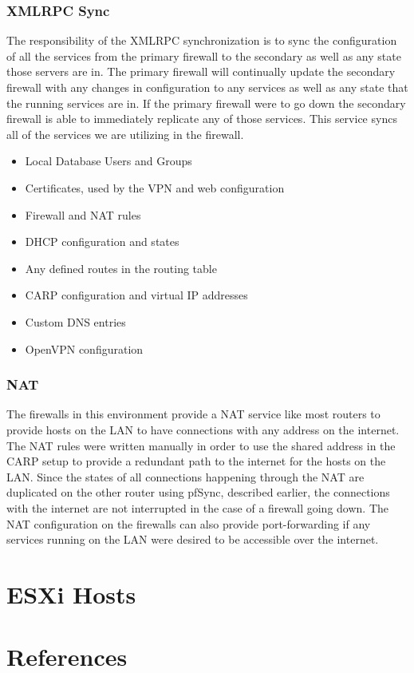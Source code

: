 \documentclass[12pt]{IEEEtran}
\begin{document}
\subsubsection{XMLRPC Sync}
The responsibility of the XMLRPC synchronization is to sync the configuration of all the services from the primary firewall to the secondary as well as any state those servers are in.
The primary firewall will continually update the secondary firewall with any changes in configuration to any services as well as any state that the running services are in.
If the primary firewall were to go down the secondary firewall is able to immediately replicate any of those services. 
This service syncs all of the services we are utilizing in the firewall. 
\begin{itemize}
\item Local Database Users and Groups
\item Certificates, used by the VPN and web configuration
\item Firewall and NAT rules
\item DHCP configuration and states
\item Any defined routes in the routing table
\item CARP configuration and virtual IP addresses
\item Custom DNS entries
\item OpenVPN configuration
\end{itemize}

\subsubsection{NAT}
The firewalls in this environment provide a NAT service like most routers to provide hosts on the LAN to have connections with any address on the internet. 
The NAT rules were written manually in order to use the shared address in the CARP setup to provide a redundant path to the internet for the hosts on the LAN.
Since the states of all connections happening through the NAT are duplicated on the other router using pfSync, described earlier, the connections with the internet are not interrupted in the case of a firewall going down. 
The NAT configuration on the firewalls can also provide port-forwarding if any services running on the LAN were desired to be accessible over the internet.  

\section{ESXi Hosts}

\newpage \section{References} \printbibliography[heading=none]
\end{document}
